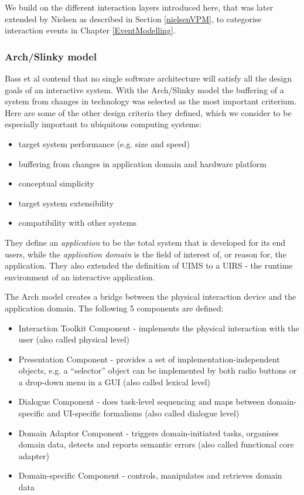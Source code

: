 	We build on the different interaction layers introduced here, that was later extended by Nielsen \cite{Nielsen1986} as described in Section \ref{nielsenVPM}, to categorise interaction events in Chapter \ref{EventModelling}.
	
\subsubsection{Arch/Slinky model}
	
	Bass et al \cite{Bass1992} contend that no single software architecture will satisfy all the design goals of an interactive system. With the Arch/Slinky model the buffering of a system from changes in technology was selected as the most important criterium. Here are some of the other design criteria they defined, which we consider to be especially important to ubiquitous computing systems:
	
	\begin{itemize}
		\item target system performance (e.g. size and speed)
		\item 	buffering from changes in application domain and hardware platform
		\item 	conceptual simplicity
		\item 	target system extensibility
		\item 	compatibility with other systems
	\end{itemize}
	
	 They define an \emph{application} to be the total system that is developed for its end users, while the \emph{application domain} is the field of interest of, or reason for, the application. They also extended the definition of \ac{UIMS} to a  \ac{UIRS} - the runtime environment of an interactive application.
	
	The Arch model creates a bridge between the physical interaction device and the application domain. The following 5 components are defined:
	
	\begin{itemize}
		\item Interaction Toolkit Component - implements the physical interaction with the user (also called physical level)
		\item Presentation Component - provides a set of implementation-independent objects, e.g. a ``selector'' object can be implemented by both radio buttons or a drop-down menu in a GUI (also called lexical level)
		\item Dialogue Component - does task-level sequencing and maps between domain-specific and UI-specific formalisms (also called dialogue level)
		\item Domain Adaptor Component - triggers domain-initiated tasks, organises domain data, detects and reports semantic errors (also called functional core adapter)
		\item Domain-specific Component - controls, manipulates and retrieves domain data
	\end{itemize}

